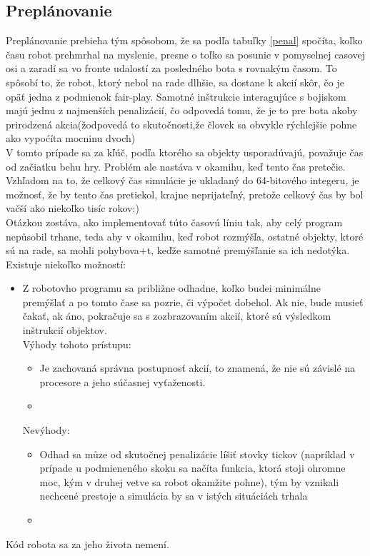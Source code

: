 \subsection{Preplánovanie}
Preplánovanie prebieha tým spôsobom, že sa podľa tabuľky \ref{penal} spočíta, koľko času robot prehmrhal na myslenie, presne o toľko sa posunie v pomyselnej casovej osi a zaradí sa vo fronte udalostí za posledného bota s rovnakým časom. To spôsobí to, že robot, ktorý nebol na rade dlhšie, sa dostane k akcií skôr, čo je opäť jedna z podmienok fair-play. Samotné inštrukcie interagujúce s bojiskom  majú jednu z najmenších penalizácií, čo odpovedá tomu, že je to pre bota akoby prirodzená akcia(žodpovedá to skutočnosti,že človek sa obvykle rýchlejšie pohne ako vypoćíta mocninu dvoch) \\
V tomto prípade sa za kľúč, podľa ktorého sa objekty usporadúvajú, považuje čas od začiatku behu hry. Problém ale nastáva v okamihu, keď tento čas pretečie. Vzhľadom na to, že celkový čas simulácie je ukladaný do 64-bitového integeru, je možnosť, že by tento čas pretiekol, krajne neprijateľný, pretože celkový čas by bol vačší ako niekoľko tisíc rokov:)\\
Otázkou zostáva, ako implementovať túto časovú líniu tak, aby celý program nepůsobil trhane, teda aby v okamihu, keď robot rozmýšľa, ostatné objekty, ktoré sú na rade, sa mohli pohybova+t, keďže samotné premýšľanie sa ich nedotýka. Existuje niekoľko možností:
\begin{itemize}
\item Z robotovho programu sa približne odhadne, koľko budei minimálne premýšlať a po tomto čase sa pozrie, či výpočet dobehol. Ak nie, bude musieť čakať, ak áno, pokračuje sa s zozbrazovaním akcií, ktoré sú výsledkom inštrukcií objektov. \\
Výhody tohoto prístupu:\begin{itemize}
	\item Je zachovaná správna postupnosť akcií, to znamená, že nie sú závislé na procesore a jeho súčasnej vyťaženosti.
	\item 
	\end{itemize}
Nevýhody:\begin {itemize}
	\item Odhad sa můze od skutočnej penalizácie líšiť stovky tickov (napríklad v prípade u podmieneného skoku sa načíta funkcia, ktorá stoji ohromne moc, kým v druhej vetve sa robot okamžite pohne), tým by vznikali nechcené prestoje a simulácia by sa v istých situáciách trhala
	\item 
	\end{itemize}
\end{itemize}
Kód robota sa za jeho života nemení. 


